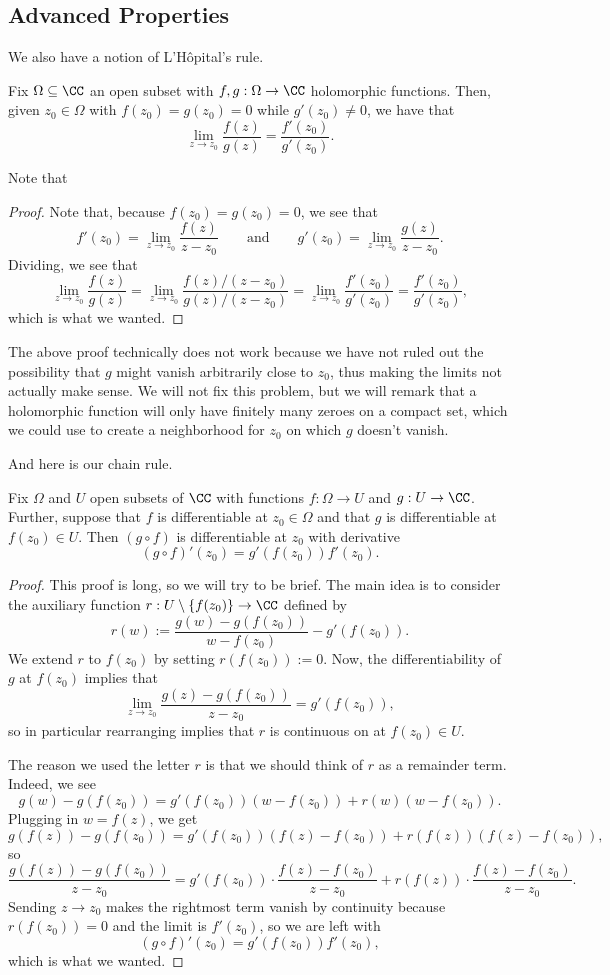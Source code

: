 \subsection{Advanced Properties}
We also have a notion of L'H\^opital's rule.
\begin{proposition}
	Fix $\Omega\subseteq\CC$ an open subset with $f,g:\Omega\to\CC$ holomorphic functions. Then, given $z_0\in\Omega$ with $f(z_0)=g(z_0)=0$ while $g'(z_0)\ne0$, we have that
	\[\lim_{z\to z_0}\frac{f(z)}{g(z)}=\frac{f'(z_0)}{g'(z_0)}.\]
\end{proposition}
Note that 
\begin{proof}
	Note that, because $f(z_0)=g(z_0)=0$, we see that
	\[f'(z_0)=\lim_{z\to z_0}\frac{f(z)}{z-z_0}\qquad\text{and}\qquad g'(z_0)=\lim_{z\to z_0}\frac{g(z)}{z-z_0}.\]
	Dividing, we see that
	\[\lim_{z\to z_0}\frac{f(z)}{g(z)}=\lim_{z\to z_0}\frac{f(z)/(z-z_0)}{g(z)/(z-z_0)}=\lim_{z\to z_0}\frac{f'(z_0)}{g'(z_0)}=\frac{f'(z_0)}{g'(z_0)},\]
	which is what we wanted.
\end{proof}
\begin{remark}[Nir]
	The above proof technically does not work because we have not ruled out the possibility that $g$ might vanish arbitrarily close to $z_0$, thus making the limits not actually make sense. We will not fix this problem, but we will remark that a holomorphic function will only have finitely many zeroes on a compact set, which we could use to create a neighborhood for $z_0$ on which $g$ doesn't vanish.
\end{remark}
And here is our chain rule.
\begin{proposition}
	Fix $\Omega$ and $U$ open subsets of $\CC$ with functions $f:\Omega\to U$ and $g:U\to\CC$. Further, suppose that $f$ is differentiable at $z_0\in\Omega$ and that $g$ is differentiable at $f(z_0)\in U$. Then $(g\circ f)$ is differentiable at $z_0$ with derivative
	\[(g\circ f)'(z_0)=g'(f(z_0))f'(z_0).\]
\end{proposition}
\begin{proof}
	This proof is long, so we will try to be brief. The main idea is to consider the auxiliary function $r:U\setminus\{f(z_0)\}\to\CC$ defined by
	\[r(w):=\frac{g(w)-g(f(z_0))}{w-f(z_0)}-g'(f(z_0)).\]
	We extend $r$ to $f(z_0)$ by setting $r(f(z_0)):=0$. Now, the differentiability of $g$ at $f(z_0)$ implies that
	\[\lim_{z\to z_0}\frac{g(z)-g(f(z_0))}{z-z_0}=g'(f(z_0)),\]
	so in particular rearranging implies that $r$ is continuous on at $f(z_0)\in U$.

	The reason we used the letter $r$ is that we should think of $r$ as a remainder term. Indeed, we see
	\[g(w)-g(f(z_0))=g'(f(z_0))(w-f(z_0))+r(w)(w-f(z_0)).\]
	Plugging in $w=f(z)$, we get
	\[g(f(z))-g(f(z_0))=g'(f(z_0))(f(z)-f(z_0))+r(f(z))(f(z)-f(z_0)),\]
	so
	\[\frac{g(f(z))-g(f(z_0))}{z-z_0}=g'(f(z_0))\cdot\frac{f(z)-f(z_0)}{z-z_0}+r(f(z))\cdot\frac{f(z)-f(z_0)}{z-z_0}.\]
	Sending $z\to z_0$ makes the rightmost term vanish by continuity because $r(f(z_0))=0$ and the limit is $f'(z_0)$, so we are left with
	\[(g\circ f)'(z_0)=g'(f(z_0))f'(z_0),\]
	which is what we wanted.
\end{proof}
